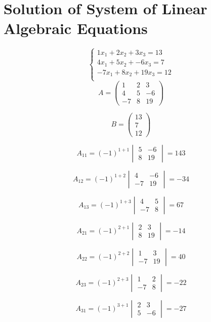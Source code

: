 \documentclass{article}
\begin{document}
\section*{Solution of System of Linear Algebraic Equations}
\[
\begin{cases}
1x_{1} + 2x_{2} + 3x_{3} = 13 \\
4x_{1} + 5x_{2} + -6x_{3} = 7 \\
-7x_{1} + 8x_{2} + 19x_{3} = 12 \\
\end{cases}
\]
\[
A = \begin{pmatrix}
1 & 2 & 3 \\
4 & 5 & -6 \\
-7 & 8 & 19
\end{pmatrix}
\]

\[
B = \begin{pmatrix}
13 \\
7 \\
12
\end{pmatrix}
\]

\[
A_{11} = (-1)^{1+1} \begin{vmatrix}
5 & -6 \\
8 & 19
\end{vmatrix}
 = 143
\]

\[
A_{12} = (-1)^{1+2} \begin{vmatrix}
4 & -6 \\
-7 & 19
\end{vmatrix}
 = -34
\]

\[
A_{13} = (-1)^{1+3} \begin{vmatrix}
4 & 5 \\
-7 & 8
\end{vmatrix}
 = 67
\]

\[
A_{21} = (-1)^{2+1} \begin{vmatrix}
2 & 3 \\
8 & 19
\end{vmatrix}
 = -14
\]

\[
A_{22} = (-1)^{2+2} \begin{vmatrix}
1 & 3 \\
-7 & 19
\end{vmatrix}
 = 40
\]

\[
A_{23} = (-1)^{2+3} \begin{vmatrix}
1 & 2 \\
-7 & 8
\end{vmatrix}
 = -22
\]

\[
A_{31} = (-1)^{3+1} \begin{vmatrix}
2 & 3 \\
5 & -6
\end{vmatrix}
 = -27
\]
\end{document}
